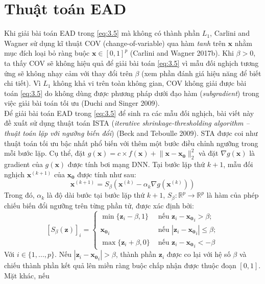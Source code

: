 \section{Thuật toán EAD}
Khi giải bài toán EAD trong \ref{eq:3.5} mà không có thành phần $L_1$, Carlini and Wagner 
sử dụng kĩ thuật COV (change-of-variable) qua hàm \textit{tanh} trên $\mathbf{x}$ nhằm 
mục đích loại bỏ ràng buộc $\mathbf{x} \in [0,1]^p$ (Carlini and Wagner 2017b). Khi 
$\beta > 0$, ta thấy COV sẽ không hiệu quả để giải bài toán \ref{eq:3.5} vì mẫu đối 
nghịch tương ứng sẽ không nhạy cảm với thay đổi trên $\beta$ (xem phần đánh giá hiệu 
năng để biết chi tiết). Vì $L_1$ không khả vi trên toàn không gian, COV không giải 
được bài toán \ref{eq:3.5} do không dùng được phương pháp dưới đạo hàm (\textit{subgradient})
trong việc giải bài toán tối ưu (Duchi and Singer 2009). \\

Để giải bài toán EAD trong \ref{eq:3.5} để sinh ra các mẫu đối nghịch, bài viết này đề
xuất sử dụng thuật toán ISTA (\textit{iterative shrinkage-thresholding algorithm – thuật toán lặp 
với ngưỡng biến đổi}) (Beck and Teboulle 2009). STA được coi như thuật toán tối ưu bậc nhất
phổ biến với thêm một bước điều chỉnh ngưỡng trong mỗi bước lặp. Cụ thể, 
đặt $g(\mathbf{x}) = c \times f(\mathbf{x}) + \lVert \mathbf{x} - \mathbf{x_0} \rVert_2^2$
và đặt $\nabla g(\mathbf{x})$ là gradient của $g(\mathbf{x})$ được tính bơi mạng DNN. 
Tại bước lặp thứ $k+1$, mẫu đối nghịch $\mathbf{x}^{(k+1)}$ của $\mathbf{x_0}$ được tính 
như sau:
\begin{equation}
    \label{eq:3.6}
    \mathbf{x}^{(k+1)} = S_{\beta} (\mathbf{x}^{(k)} - \alpha_k \nabla g(\mathbf{x}^{(k)}))
\end{equation}
Trong đó, $\alpha_k$ là độ dài bước tại bước lặp thứ $k+1$, $S_{\beta} : \mathbb{R}^p \to 
\mathbb{R}^p$ là hàm của phép chiếu biến đổi ngưỡng trên từng phần tử, được xác định bởi:
\begin{equation}
    \label{eq:3.7}
    [S_{\beta}(\mathbf{z})]_i = 
    \begin{cases}
        \min \{ \mathbf{z}_i - \beta, 1 \} &\text{ nếu } \mathbf{z}_i - \mathbf{x_0}_i  > \beta; \\
        \mathbf{x_0}_i &\text{ nếu } |\mathbf{z}_i - \mathbf{x_0}_i| \leq \beta; \\
        \max \{ \mathbf{z}_i + \beta, 0 \} &\text{ nếu } \mathbf{z}_i - \mathbf{x_0}_i < -\beta
    \end{cases}
\end{equation}
Với $i \in \{ 1, ..., p \}$. Nếu $|\mathbf{z}_i - \mathbf{x_0}_i| > \beta$, thành phần 
$\mathbf{z}_i$ được co lại với hệ số $\beta$ và chiếu thành phần kết quả lên miền ràng buộc 
chấp nhận được thuộc đoạn $[0,1]$. Mặt khác, nếu 